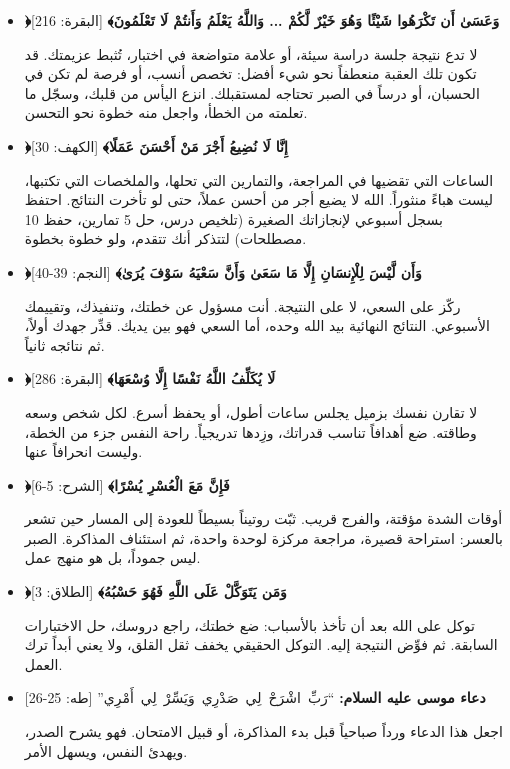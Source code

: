 \documentclass[12pt,a4paper]{book}
\begin{document}
	\begin{itemize}
		\item \textbf{﴿وَعَسَىٰ أَن تَكْرَهُوا شَيْئًا وَهُوَ خَيْرٌ لَّكُمْ ... وَاللَّهُ يَعْلَمُ وَأَنتُمْ لَا تَعْلَمُونَ﴾} \textnormal{[البقرة: 216]}
		
		لا تدع نتيجة جلسة دراسة سيئة، أو علامة متواضعة في اختبار، تُثبط عزيمتك. قد تكون تلك العقبة منعطفاً نحو شيء أفضل: تخصص أنسب، أو فرصة لم تكن في الحسبان، أو درساً في الصبر تحتاجه لمستقبلك. انزع اليأس من قلبك، وسجّل ما تعلمته من الخطأ، واجعل منه خطوة نحو التحسن.
		
		\item \textbf{﴿إِنَّا لَا نُضِيعُ أَجْرَ مَنْ أَحْسَنَ عَمَلًا﴾} \textnormal{[الكهف: 30]}
		
		الساعات التي تقضيها في المراجعة، والتمارين التي تحلها، والملخصات التي تكتبها، ليست هباءً منثوراً. الله لا يضيع أجر من أحسن عملاً، حتى لو تأخرت النتائج. احتفظ بسجل أسبوعي لإنجازاتك الصغيرة (تلخيص درس، حل 5 تمارين، حفظ 10 مصطلحات) لتتذكر أنك تتقدم، ولو خطوة بخطوة.
		
		\item \textbf{﴿وَأَن لَّيْسَ لِلْإِنسَانِ إِلَّا مَا سَعَىٰ وَأَنَّ سَعْيَهُ سَوْفَ يُرَىٰ﴾} \textnormal{[النجم: 39-40]}
		
		ركّز على السعي، لا على النتيجة. أنت مسؤول عن خطتك، وتنفيذك، وتقييمك الأسبوعي. النتائج النهائية بيد الله وحده، أما السعي فهو بين يديك. قدِّر جهدك أولاً، ثم نتائجه ثانياً.
		
		\item \textbf{﴿لَا يُكَلِّفُ اللَّهُ نَفْسًا إِلَّا وُسْعَهَا﴾} \textnormal{[البقرة: 286]}
		
		لا تقارن نفسك بزميل يجلس ساعات أطول، أو يحفظ أسرع. لكل شخص وسعه وطاقته. ضع أهدافاً تناسب قدراتك، وزِدها تدريجياً. راحة النفس جزء من الخطة، وليست انحرافاً عنها.
		
		\item \textbf{﴿فَإِنَّ مَعَ الْعُسْرِ يُسْرًا﴾} \textnormal{[الشرح: 5-6]}
		
		أوقات الشدة مؤقتة، والفرج قريب. ثبّت روتيناً بسيطاً للعودة إلى المسار حين تشعر بالعسر: استراحة قصيرة، مراجعة مركزة لوحدة واحدة، ثم استئناف المذاكرة. الصبر ليس جموداً، بل هو منهج عمل.
		
		\item \textbf{﴿وَمَن يَتَوَكَّلْ عَلَى اللَّهِ فَهُوَ حَسْبُهُ﴾} \textnormal{[الطلاق: 3]}
		
		توكل على الله بعد أن تأخذ بالأسباب: ضع خطتك، راجع دروسك، حل الاختبارات السابقة. ثم فوِّض النتيجة إليه. التوكل الحقيقي يخفف ثقل القلق، ولا يعني أبداً ترك العمل.
		
		\item \textbf{دعاء موسى عليه السلام:} \textnormal{\mbox{``رَبِّ اشْرَحْ لِي صَدْرِي وَيَسِّرْ لِي أَمْرِي''}} \textnormal{[طه: 25-26]}
		
		اجعل هذا الدعاء ورداً صباحياً قبل بدء المذاكرة، أو قبيل الامتحان. فهو يشرح الصدر، ويهدئ النفس، ويسهل الأمر.
	\end{itemize}
	
\end{document}
